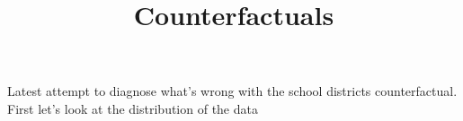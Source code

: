 \documentclass{article}
\title{Counterfactuals}
\begin{document}
\maketitle

{\footnotesize }

Latest attempt to diagnose what's wrong with the school districts counterfactual. First let's look at the distribution of the data
\end{document}

